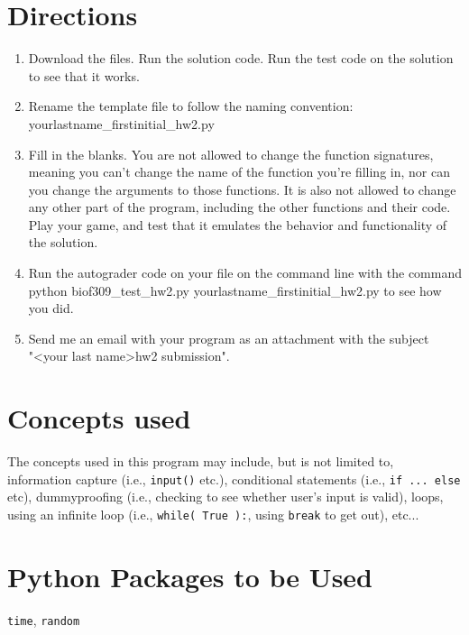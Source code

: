 \documentclass[11pt]{amsart}
\begin{document}
\section*{Directions}
\begin{enumerate}
	\item Download the files. Run the solution code. Run the test code on the solution to see
        that it works.
	\item Rename the template file to follow the naming convention: yourlastname_firstinitial_hw2.py
	\item Fill in the blanks. You are not allowed to change the function signatures, meaning
        you can't change the name of the function you're filling in, nor can you change the
        arguments to those functions. It is also not allowed to change any other part of the
        program, including the other functions and their code. Play your game, and test that
        it emulates the behavior and functionality of the solution.
	\item Run the autograder code on your file on the command line with the command
        python biof309_test_hw2.py yourlastname_firstinitial_hw2.py to see how you did.
	\item Send me an email with your program as an attachment with the subject \\
        "\textless your last name\textgreater hw2 submission".
\end{enumerate}

\section*{Concepts used}
The concepts used in this program may include, but is not limited to, information capture (i.e., \texttt{input()} etc.), conditional statements (i.e., \texttt{if ... else} etc), dummyproofing (i.e., checking to see whether user's input is valid), loops, using an infinite loop (i.e., \texttt{while( True ):}, using \texttt{break} to get out), etc...

\section*{Python Packages to be Used}
\texttt{time}, \texttt{random}
\end{document}
